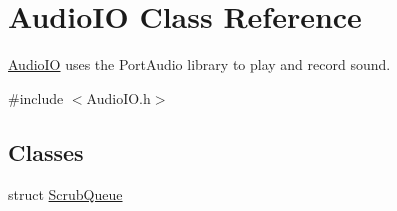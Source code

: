 \hypertarget{class_audio_i_o}{}\section{Audio\+IO Class Reference}
\label{class_audio_i_o}


\hyperlink{class_audio_i_o}{Audio\+IO} uses the Port\+Audio library to play and record sound.  




{\ttfamily \#include $<$Audio\+I\+O.\+h$>$}

\subsection*{Classes}
\begin{DoxyCompactItemize}
\item 
struct \hyperlink{struct_audio_i_o_1_1_scrub_queue}{Scrub\+Queue}
\end{DoxyCompactItemize}
